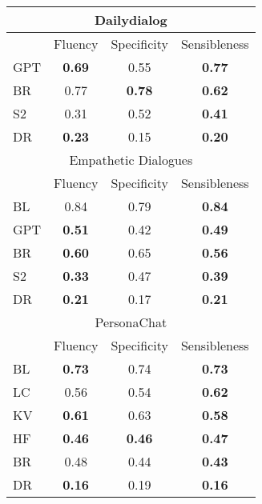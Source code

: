 \begin{tabular}{l|ccc}
    
    \multicolumn{4}{c}{Dailydialog} \\
    \toprule
    & Fluency & Specificity & Sensibleness \\ \hline
    GPT & \bf 0.69 & 0.55     & \bf 0.77\\
    BR  & 0.77     & \bf 0.78 & \bf 0.62\\
    S2  & 0.31     & 0.52     & \bf 0.41\\
    DR  & \bf 0.23 & 0.15     & \bf 0.20\\
    \bottomrule
    

    \multicolumn{4}{c}{Empathetic Dialogues} \\
    \toprule
    & Fluency & Specificity & Sensibleness \\ \hline 
    BL  & 0.84     & 0.79 & \bf 0.84\\
    GPT & \bf 0.51 & 0.42 & \bf 0.49\\
    BR  & \bf 0.60 & 0.65 & \bf 0.56\\
    S2  & \bf 0.33 & 0.47 & \bf 0.39\\
    DR  & \bf 0.21 & 0.17 & \bf 0.21\\
    \bottomrule
    

    \multicolumn{4}{c}{PersonaChat} \\
    \toprule
    & Fluency & Specificity & Sensibleness \\ \hline
    BL  & \bf 0.73 & 0.74     & \bf 0.73\\
    LC  & 0.56     & 0.54     & \bf 0.62\\
    KV  & \bf 0.61 & 0.63     & \bf 0.58\\
    HF  & \bf 0.46 & \bf 0.46 & \bf 0.47\\    
    BR  & 0.48     & 0.44     & \bf 0.43\\
    DR  & \bf 0.16 & 0.19     & \bf 0.16\\
    \bottomrule

\end{tabular}
